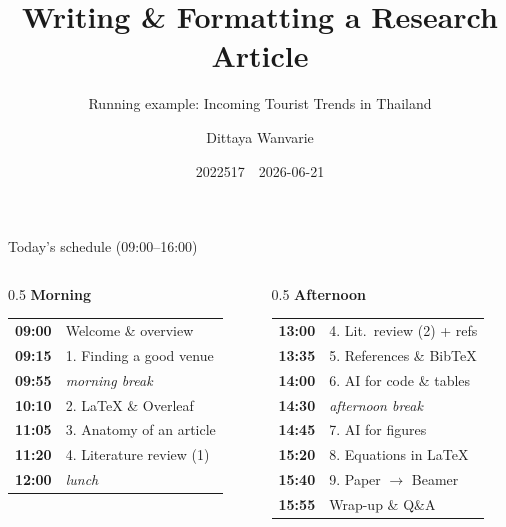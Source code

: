 \documentclass[aspectratio=169,11pt]{beamer}
\title[Writing a Research Article]{Writing \& Formatting a Research Article}
\subtitle{Running example: Incoming Tourist Trends in Thailand}
\author[2022517]{Dittaya Wanvarie}
\institute{Chulalongkorn University}
\date{2022517 \,\textbullet\, 2026-06-21}
\begin{document}

\begin{frame}{Today's schedule (09:00--16:00)}
  \begin{columns}[T]
    \begin{column}{0.5\textwidth}
      \footnotesize
      \textbf{Morning}\\[0.3em]
      \begin{tabular}{@{}ll@{}}
        \textbf{09:00} & Welcome \& overview \\
        \textbf{09:15} & 1. Finding a good venue \\
        \textbf{09:55} & \emph{morning break} \\
        \textbf{10:10} & 2. LaTeX \& Overleaf \\
        \textbf{11:05} & 3. Anatomy of an article \\
        \textbf{11:20} & 4. Literature review (1) \\
        \textbf{12:00} & \emph{lunch} \\
      \end{tabular}
    \end{column}
    \begin{column}{0.5\textwidth}
      \footnotesize
      \textbf{Afternoon}\\[0.3em]
      \begin{tabular}{@{}ll@{}}
        \textbf{13:00} & 4. Lit.\ review (2) + refs \\
        \textbf{13:35} & 5. References \& BibTeX \\
        \textbf{14:00} & 6. AI for code \& tables \\
        \textbf{14:30} & \emph{afternoon break} \\
        \textbf{14:45} & 7. AI for figures \\
        \textbf{15:20} & 8. Equations in LaTeX \\
        \textbf{15:40} & 9. Paper $\rightarrow$ Beamer \\
        \textbf{15:55} & Wrap-up \& Q\&A \\
      \end{tabular}
    \end{column}
  \end{columns}
\end{frame}
\end{document}
